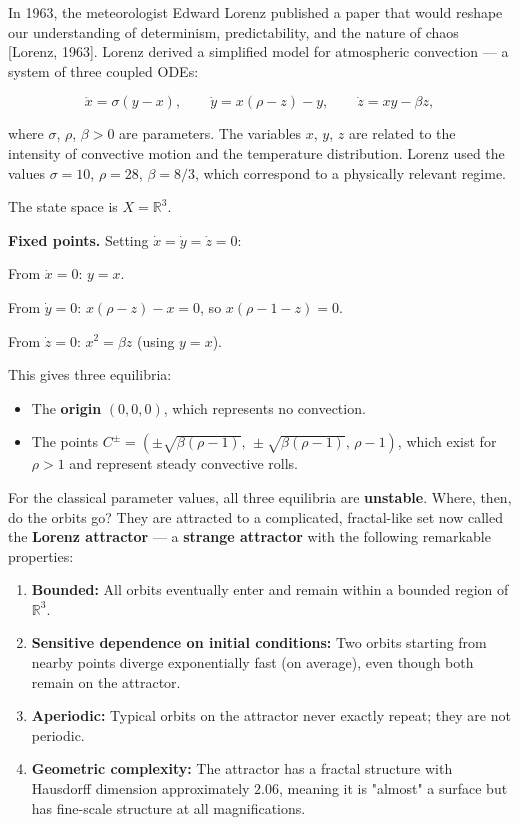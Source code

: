 In 1963, the meteorologist Edward Lorenz published a paper that would reshape our understanding of determinism, predictability, and the nature of chaos [Lorenz, 1963]. Lorenz derived a simplified model for atmospheric convection --- a system of three coupled ODEs:

\[
\dot{x} = \sigma(y - x), \qquad \dot{y} = x(\rho - z) - y, \qquad \dot{z} = xy - \beta z,
\]

where $\sigma$, $\rho$, $\beta > 0$ are parameters. The variables $x$, $y$, $z$ are related to the intensity of convective motion and the temperature distribution. Lorenz used the values $\sigma = 10$, $\rho = 28$, $\beta = 8/3$, which correspond to a physically relevant regime.

The state space is $X = \mathbb{R}^3$.

\textbf{Fixed points.} Setting $\dot{x} = \dot{y} = \dot{z} = 0$:

From $\dot{x} = 0$: $y = x$.

From $\dot{y} = 0$: $x(\rho - z) - x = 0$, so $x(\rho - 1 - z) = 0$.

From $\dot{z} = 0$: $x^2 = \beta z$ (using $y = x$).

This gives three equilibria:
\begin{itemize}[nosep]
  \item The \textbf{origin} $(0, 0, 0)$, which represents no convection.
  \item The points $C^{\pm} = (\pm\sqrt{\beta(\rho - 1)}, \, \pm\sqrt{\beta(\rho - 1)}, \, \rho - 1)$, which exist for $\rho > 1$ and represent steady convective rolls.
\end{itemize}

For the classical parameter values, all three equilibria are \textbf{unstable}. Where, then, do the orbits go? They are attracted to a complicated, fractal-like set now called the \textbf{Lorenz attractor} --- a \textbf{strange attractor} with the following remarkable properties:

\begin{enumerate}[nosep]
  \item \textbf{Bounded:} All orbits eventually enter and remain within a bounded region of $\mathbb{R}^3$.
  \item \textbf{Sensitive dependence on initial conditions:} Two orbits starting from nearby points diverge exponentially fast (on average), even though both remain on the attractor.
  \item \textbf{Aperiodic:} Typical orbits on the attractor never exactly repeat; they are not periodic.
  \item \textbf{Geometric complexity:} The attractor has a fractal structure with Hausdorff dimension approximately $2.06$, meaning it is "almost" a surface but has fine-scale structure at all magnifications.
\end{enumerate}

